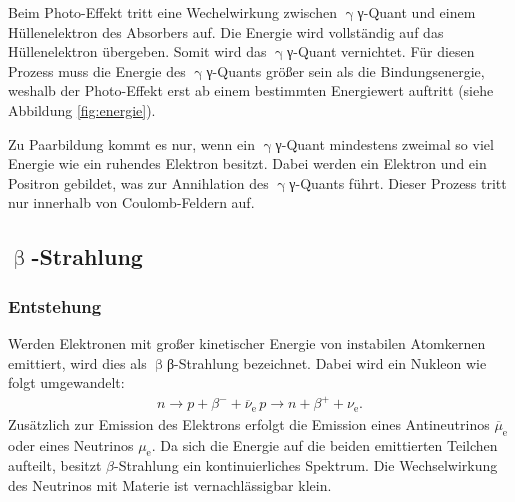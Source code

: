 Beim Photo-Effekt tritt eine Wechelwirkung zwischen $\upgamma${γ}-Quant und einem Hüllenelektron des Absorbers auf. Die Energie wird vollständig auf das Hüllenelektron übergeben. Somit wird das $\upgamma${γ}-Quant vernichtet. Für diesen Prozess muss die Energie des $\upgamma${γ}-Quants größer sein als die Bindungsenergie, weshalb der Photo-Effekt erst ab einem bestimmten Energiewert auftritt (siehe Abbildung \ref{fig:energie}).

Zu Paarbildung kommt es nur, wenn ein $\upgamma${γ}-Quant mindestens zweimal so viel Energie wie ein ruhendes Elektron besitzt. Dabei werden ein Elektron und ein Positron gebildet, was zur Annihlation des $\upgamma${γ}-Quants führt. Dieser Prozess tritt nur innerhalb von Coulomb-Feldern auf.


\subsection{\texorpdfstring{$\upbeta$}{β}-Strahlung}
\subsubsection{Entstehung}
Werden Elektronen mit großer kinetischer Energie von instabilen Atomkernen emittiert, wird dies als $\upbeta${β}-Strahlung bezeichnet. Dabei wird ein Nukleon wie folgt umgewandelt:
\begin{align}
  n \rightarrow p + \beta^- + \overline{\nu}_\mathrm{e} \,
  p \rightarrow n + \beta^+ +\nu_\mathrm{e}.
\end{align}
Zusätzlich zur Emission des Elektrons erfolgt die Emission eines Antineutrinos $\overline{\mu}_\mathrm{e}$ oder eines Neutrinos $\mu_\mathrm{e}$. Da sich die Energie auf die beiden emittierten Teilchen aufteilt, besitzt $\beta$-Strahlung ein kontinuierliches Spektrum. Die Wechselwirkung des Neutrinos mit Materie ist vernachlässigbar klein.

